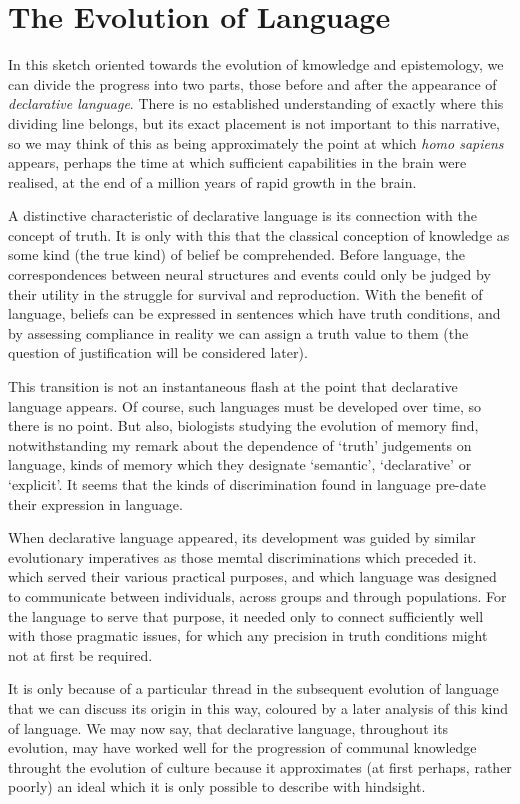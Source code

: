 \section{The Evolution of Language}

In this sketch oriented towards the evolution of kmowledge and epistemology, we can divide the progress into two parts, those before and after the appearance of \emph{declarative language}.
There is no established understanding of exactly where this dividing line belongs, but its exact placement is not important to this narrative, so we may think of this as being approximately the point at which \emph{homo sapiens} appears, perhaps the time at which sufficient capabilities in the brain were realised, at the end of a million years of rapid growth in the brain.

A distinctive characteristic of declarative language is its connection with the concept of truth.
It is only with this that the classical conception of knowledge as some kind (the true kind)  of belief be comprehended.
Before language, the correspondences between neural structures and events could only be judged by their utility in the struggle for survival and reproduction.
With the benefit of language, beliefs can be expressed in sentences which have truth conditions, and by assessing compliance in reality we can assign a truth value to them (the question of justification will be considered later).

This transition is not an instantaneous flash at the point that declarative language appears.
Of course, such languages must be developed over time, so there is no point.
But also, biologists studying the evolution of memory find, notwithstanding my remark about the dependence of `truth' judgements on language, kinds of memory which they designate `semantic', `declarative' or `explicit'.
It seems that the kinds of discrimination found in language pre-date their expression in language.

When declarative language appeared, its development was guided by similar evolutionary imperatives as those memtal discriminations which preceded it. which served their various practical purposes, and which language was designed to communicate between individuals, across groups and through populations.
For the language to serve that purpose, it needed only to connect sufficiently well with those pragmatic issues, for which any precision in truth conditions might not at first be required.

It is only because of a particular thread in the subsequent evolution of language that we can discuss its origin in this way, coloured by a later analysis of this kind of language.
We may now say, that declarative language, throughout its evolution, may have worked well for the progression of communal knowledge throught the evolution of culture because it approximates (at first perhaps, rather poorly) an ideal which it is only possible to describe with hindsight.

